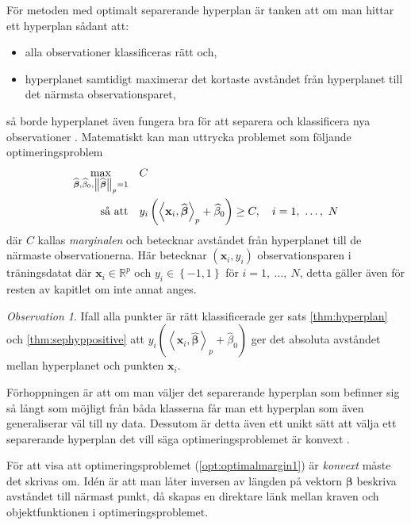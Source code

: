 \documentclass[a4paper, 12pt]{report}
\theoremstyle{definition}
\theoremstyle{remark}
\newtheorem*{rem}{Observation}
\newcommand{\bfbeta}{{\boldsymbol{\beta}}}
\newcommand{\bfx}{\mathbf{x}}
\newcommand{\llangle}{\left\langle}
\newcommand{\rrangle}{\right\rangle}
\newcommand{\inner}[2]{\llangle #1, #2 \rrangle}
\begin{document}
För metoden med optimalt separerande hyperplan är tanken att om man hittar ett hyperplan sådant att:
\begin{itemize}
	\item alla observationer klassificeras rätt och,
	\item hyperplanet samtidigt maximerar det kortaste avståndet från hyperplanet till det närmsta observationsparet,
\end{itemize}
så borde hyperplanet även fungera bra för att separera och klassificera nya observationer \cite{VapnikLerner1963}.
Matematiskt kan man uttrycka problemet som följande optimeringsproblem
\begin{equation}\label{opt:optimalmargin1}
\begin{aligned}
	 \operatornamewithlimits{max}_{\widehat{\bfbeta}, \widehat{\beta}_0, \left\|\widehat{\bfbeta}\right\|_p=1}& & &C\\
	 \text{så att}& & &y_i\left(\inner{\bfx_i}{\widehat{\bfbeta}}_p+\widehat{\beta}_0\right)\geq C,\quad i=1,~\dots,~N
\end{aligned}
\end{equation}
där $C$ kallas \emph{marginalen} och betecknar avståndet från hyperplanet till de närmaste observationerna. Här betecknar $\left(\bfx_i, y_i\right)$ observationsparen i träningsdatat där $\bfx_i\in\mathbb{R}^p$ och $y_i\in\left\{-1, 1 \right\}$ för $i=1,~\dots,~N$, detta gäller även för resten av kapitlet om inte annat anges.
\begin{rem}
	Ifall alla punkter är rätt klassificerade ger sats \ref{thm:hyperplan} och \ref{thm:sephyppositive} att $y_i\left(\inner{\bfx_i}{\widehat{\bfbeta}}_p+\widehat{\beta}_0\right)$ ger det absoluta avståndet mellan hyperplanet och punkten $\mathbf{x}_i$.
\end{rem}

Förhoppningen är att om man väljer det separerande hyperplan som befinner sig så långt som möjligt från båda klasserna får man ett hyperplan som även generaliserar väl till ny data. Dessutom är detta även ett unikt sätt att välja ett separerande hyperplan det vill säga optimeringsproblemet är konvext \cite{ESL}. %

För att visa att optimeringsproblemet (\ref{opt:optimalmargin1}) är \textit{konvext} måste det skrivas om. Idén är att man låter inversen av längden på vektorn $\bfbeta$ beskriva avståndet till närmast punkt, då skapas en direktare länk mellan kraven och objektfunktionen i optimeringsproblemet.
\end{document}

